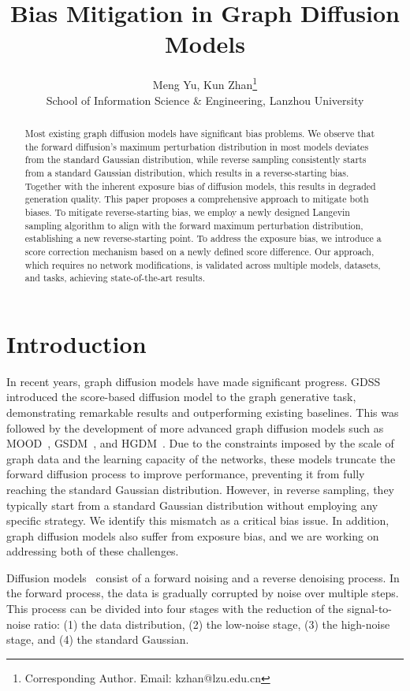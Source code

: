 \documentclass{article}
\title{Bias Mitigation in Graph Diffusion Models}
\author{Meng Yu, Kun Zhan\thanks{Corresponding Author. Email: kzhan@lzu.edu.cn}\\
School of Information Science \& Engineering, Lanzhou University}
\begin{document}
\maketitle
\begin{abstract}
Most existing graph diffusion models have significant bias problems. We observe that the forward diffusion’s maximum perturbation distribution in most models deviates from the standard Gaussian distribution, while reverse sampling consistently starts from a standard Gaussian distribution, which results in a reverse-starting bias. Together with the inherent exposure bias of diffusion models, this results in degraded generation quality. This paper proposes a comprehensive approach to mitigate both biases. To mitigate reverse-starting bias, we employ a newly designed Langevin sampling algorithm to align with the forward maximum perturbation distribution, establishing a new reverse-starting point. To address the exposure bias, we introduce a score correction mechanism based on a newly defined score difference. Our approach, which requires no network modifications, is validated across multiple models, datasets, and tasks, achieving state-of-the-art results.
\end{abstract}
\section{Introduction}
In recent years, graph diffusion models have made significant progress. GDSS~\citep{jo2022GDSS} introduced the score-based diffusion model to the graph generative task, demonstrating remarkable results and outperforming existing baselines. This was followed by the development of more advanced graph diffusion models such as MOOD~\citep{lee2023exploring}, GSDM~\citep{luo2023fast}, and HGDM~\citep{wen2024hyperbolic}. Due to the constraints imposed by the scale of graph data and the learning capacity of the networks, these models truncate the forward diffusion process to improve performance, preventing it from fully reaching the standard Gaussian distribution. However, in reverse sampling, they typically start from a standard Gaussian distribution without employing any specific strategy. We identify this mismatch as a critical bias issue. In addition, graph diffusion models also suffer from exposure bias, and we are working on addressing both of these challenges.

Diffusion models~\citep{ho2020denoising,song2021scorebased} consist of a forward noising and a reverse denoising process. In the forward process, the data is gradually corrupted by noise over multiple steps. This process can be divided into four stages with the reduction of the signal-to-noise ratio: (1) the data distribution, (2) the low-noise stage, (3) the high-noise stage, and (4) the standard Gaussian.
\end{document}
